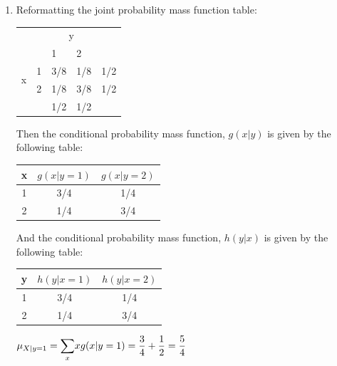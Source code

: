 \documentclass{article}
\newcommand\lsum{\mathlarger{\sum}}
\begin{document}
\begin{enumerate}
     \item
      Reformatting the joint probability mass function table:
      
	\begin{center}
	\begin{tabular}{lllll}
						  &                        & \multicolumn{2}{c}{y}                               &                          \\ \cline{3-4}
						  & \multicolumn{1}{l|}{}  & \multicolumn{1}{l|}{1}   & \multicolumn{1}{l|}{2}   &                          \\ \cline{2-4} 
	  \multicolumn{1}{l|}{\multirow{2}{*}{x}} & \multicolumn{1}{l|}{1} & \multicolumn{1}{l|}{3/8} & \multicolumn{1}{l|}{1/8} & \multicolumn{1}{l}{1/2} \\ \cline{2-4} 
	  \multicolumn{1}{l|}{}                   & \multicolumn{1}{l|}{2} & \multicolumn{1}{l|}{1/8} & \multicolumn{1}{l|}{3/8} & \multicolumn{1}{l}{1/2} \\ \cline{2-4} 
						  & \multicolumn{1}{l}{}  & \multicolumn{1}{l}{1/2} & \multicolumn{1}{l}{1/2} &                          \\ 
	\end{tabular}
	\end{center}
      
      Then the conditional probability mass function, $g(x|y)$ is given by the following table: 
      
      \begin{center}
      \begin{tabular}{c|c|c}
	x & $g(x|y=1)$ & $g(x|y=2)$ \\ \hline
	1 & 3/4 & 1/4 \\
	2 & 1/4 & 3/4
      \end{tabular}
      \end{center}
      
      And the conditional probability mass function, $h(y|x)$ is given by the following table:
      
      \begin{center}
      \begin{tabular}{c|c|c}
	y & $h(y|x=1)$ & $h(y|x=2)$ \\ \hline
	1 & 3/4 & 1/4 \\
	2 & 1/4 & 3/4
      \end{tabular}
      \end{center}
      
      $\mu_{X|y=1} = \lsum_x{x g(x|y=1)} = \dfrac{3}{4} + \dfrac{1}{2} = \dfrac{5}{4}$
      

\end{enumerate}
\end{document}
